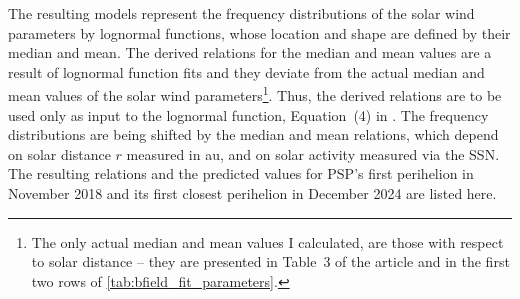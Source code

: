 \medskip

The resulting models represent the frequency distributions of the solar wind parameters by lognormal functions, whose location and shape are defined by their median and mean.
The derived relations for the median and mean values are a result of lognormal function fits and they deviate from the actual median and mean values of the solar wind parameters\footnote{The only actual median and mean values I calculated, are those with respect to solar distance -- they are presented in Table~3 of the article and in the first two rows of \autoref{tab:bfield_fit_parameters}.}. Thus, the derived relations are to be used only as input to the lognormal function, Equation~(4) in \citet{Venzmer2018}.
The frequency distributions are being shifted by the median and mean relations, which depend on solar distance $r$ measured in au, and on solar activity measured via the SSN. The resulting relations and the predicted values for PSP's first perihelion in November 2018 and its first closest perihelion in December 2024 are listed here.

